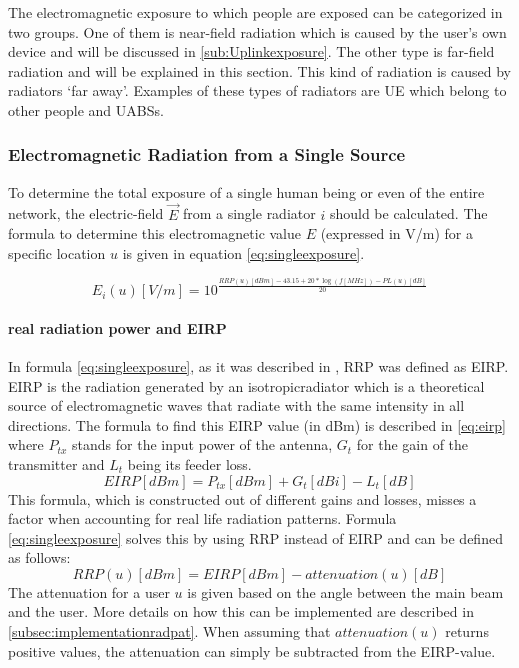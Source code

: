 The electromagnetic exposure to which people are exposed can be categorized in two groups. One of them is near-field radiation which is caused 
by the user's own device and will be discussed in \ref{sub:Uplinkexposure}.
The other type is far-field radiation and will be explained in this section. This kind of radiation is caused by radiators `far away'.
Examples of these types of radiators are \gls{UE} which belong to other people and \gls{UABS}s. 

\subsubsection{Electromagnetic Radiation from a Single Source}
\label{sec:calculatingexposure}

To determine the total exposure of a single human being or even of the entire network, the electric-field $\vec{E}$ from a single radiator $i$ should be calculated.
The formula to determine this electromagnetic value $E$ (expressed in V/m) for a specific location $u$ is given in equation \ref{eq:singleexposure}.

\begin{equation}
E_i(u) [V/m] = 10^{\frac{RRP(u)[dBm] - 43.15 + 20*\log(f [MHz])- PL(u) [dB]}{20}}
\label{eq:singleexposure}
\end{equation}

\paragraph{real radiation power and EIRP}
In formula \ref{eq:singleexposure}, as it was described in \cite{J6_originalExposureFormula, J1}, 
\gls{RRP} was defined as \gls{EIRP}. \gls{EIRP} is the radiation generated by an \gls{isotropicradiator} which is
a theoretical source of electromagnetic waves that radiate with the same intensity in all directions. 
The formula to find this \gls{EIRP} value (in dBm) is described in \ref{eq:eirp}
where $P_{tx}$ stands for the input power of the antenna, $G_t$ for the gain of the transmitter and $L_t$ being its feeder loss.
\begin{equation}
EIRP [dBm] = P_{tx} [dBm] + G_t [dBi]- L_t [dB]
\label{eq:eirp}
\end{equation}
This formula, which is constructed out of different gains and losses, misses a factor when accounting for real life radiation patterns.
Formula \ref{eq:singleexposure} solves this by using \gls{RRP} instead of \gls{EIRP} and can be defined as follows:
\begin{equation}
RRP(u) [dBm] = EIRP [dBm] - attenuation(u) [dB]
\label{eq:rrp}
\end{equation}
The attenuation for a user $u$ is given based on the angle between the main beam and the user. More details on how this can be implemented are described in \ref{subsec:implementationradpat}.
When assuming that $attenuation(u)$ returns positive values, the attenuation can simply be subtracted from the EIRP-value.

